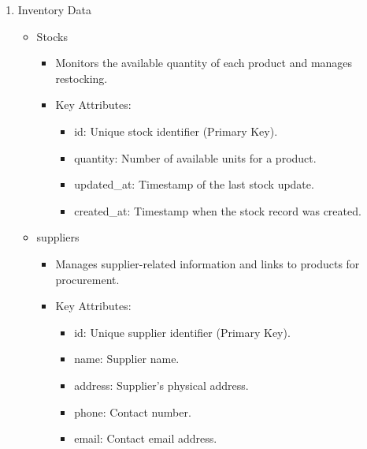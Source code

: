 \documentclass{llncs}
\begin{document}
\begin{enumerate}
\begin{itemize}
\begin{itemize}
\begin{itemize}
            \end{itemize}
        \end{itemize}
     \end{itemize}

    \item Inventory Data\\
    \begin{itemize}
        \item Stocks 
        \begin{itemize}
            \item Monitors the available quantity of each product and manages restocking.
            \item Key Attributes:
            \begin{itemize}
                \item id: Unique stock identifier (Primary Key).
                \item quantity: Number of available units for a product.
                \item updated\_at: Timestamp of the last stock update.
                \item created\_at: Timestamp when the stock record was created.\\
                
            \end{itemize}
        \end{itemize}
        \item suppliers
        \begin{itemize}
            \item Manages supplier-related information and links to products for procurement.
            \item Key Attributes:
            \begin{itemize}
                \item id: Unique supplier identifier (Primary Key).
                \item name: Supplier name.
                \item address: Supplier’s physical address.
                \item phone: Contact number.
                \item email: Contact email address.\\
                

\end{itemize}
\end{itemize}
\end{itemize}
\end{enumerate}
\end{document}

